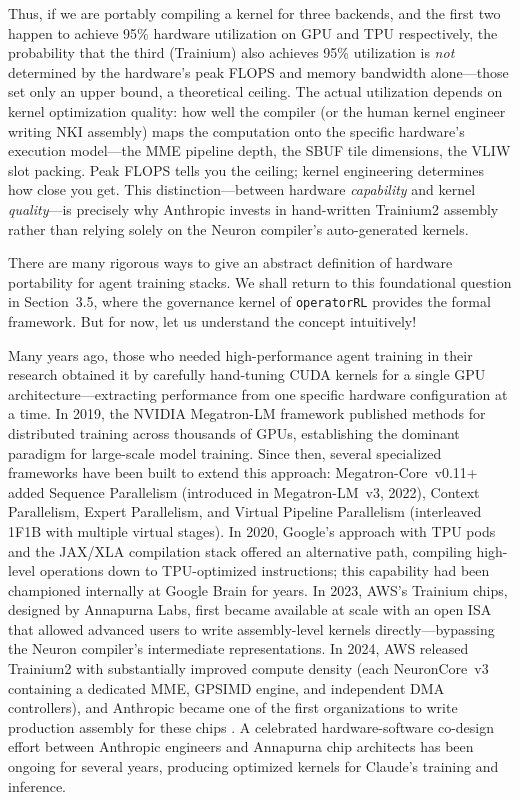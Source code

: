 \documentclass[12pt]{article}
\newcommand{\SBUF}{\textsc{SBUF}}                 %
\newcommand{\MME}{\textsc{MME}}                   %
\newcommand{\GPSIMD}{\textsc{GPSIMD}}             %
\begin{document}
Thus, if we are portably compiling a kernel for three backends, and the first two happen to achieve 95\% hardware utilization on GPU and TPU respectively, the probability that the third (Trainium) also achieves 95\% utilization is \emph{not} determined by the hardware's peak FLOPS and memory bandwidth alone---those set only an upper bound, a theoretical ceiling. The actual utilization depends on kernel optimization quality: how well the compiler (or the human kernel engineer writing NKI assembly) maps the computation onto the specific hardware's execution model---the \MME{} pipeline depth, the \SBUF{} tile dimensions, the VLIW slot packing. Peak FLOPS tells you the ceiling; kernel engineering determines how close you get. This distinction---between hardware \emph{capability} and kernel \emph{quality}---is precisely why Anthropic invests in hand-written Trainium2 assembly rather than relying solely on the Neuron compiler's auto-generated kernels.

There are many rigorous ways to give an abstract definition of hardware portability for agent training stacks. We shall return to this foundational question in Section~3.5, where the governance kernel of \texttt{operatorRL} provides the formal framework. But for now, let us understand the concept intuitively!

Many years ago, those who needed high-performance agent training in their research obtained it by carefully hand-tuning CUDA kernels for a single GPU architecture---extracting performance from one specific hardware configuration at a time. In 2019, the NVIDIA Megatron-LM framework \citep{shoeybi2019megatron} published methods for distributed training across thousands of GPUs, establishing the dominant paradigm for large-scale model training. Since then, several specialized frameworks have been built to extend this approach: Megatron-Core~v0.11+ added Sequence Parallelism (introduced in Megatron-LM~v3, 2022), Context Parallelism, Expert Parallelism, and Virtual Pipeline Parallelism (interleaved 1F1B with multiple virtual stages). In 2020, Google's approach with TPU pods and the JAX/XLA compilation stack offered an alternative path, compiling high-level operations down to TPU-optimized instructions; this capability had been championed internally at Google Brain for years. In 2023, AWS's Trainium chips, designed by Annapurna Labs, first became available at scale with an open ISA that allowed advanced users to write assembly-level kernels directly---bypassing the Neuron compiler's intermediate representations. In 2024, AWS released Trainium2 with substantially improved compute density (each NeuronCore~v3 containing a dedicated \MME{}, \GPSIMD{} engine, and independent DMA controllers), and Anthropic became one of the first organizations to write production assembly for these chips \citep{semianalysis2024trainium2}. A celebrated hardware-software co-design effort between Anthropic engineers and Annapurna chip architects has been ongoing for several years, producing optimized kernels for Claude's training and inference.
\end{document}
